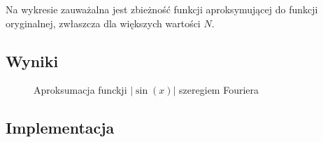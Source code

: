 \documentclass{article}
\begin{document}
Na wykresie zauważalna jest zbieżność funkcji aproksymującej do funkcji oryginalnej, zwłaszcza dla większych wartości \( N \).

\subsection{Wyniki}

\begin{figure}[H]
  \caption{Aproksumacja funckji $\left| \sin(x) \right|$ szeregiem Fouriera}
  \label{fig:key}
\end{figure}

\subsection{Implementacja}
\end{document}
